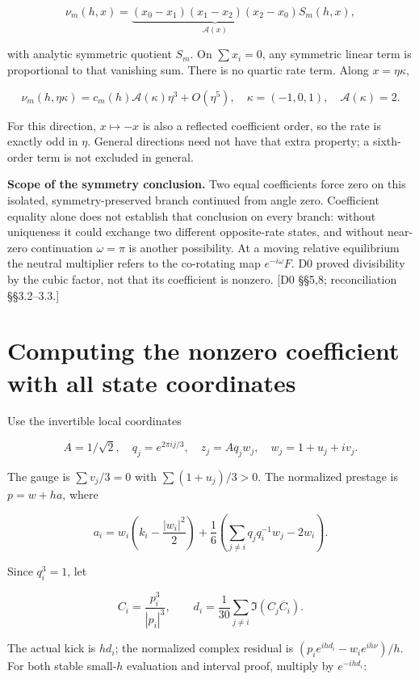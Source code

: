 \documentclass[11pt,a4paper]{article}
\begin{document}
\[
\nu_m(h,x)=
\underbrace{(x_0-x_1)(x_1-x_2)(x_2-x_0)}_{\mathcal A(x)}
S_m(h,x),
\tag{D29}\label{eq:D29}
\]

with analytic symmetric quotient \(S_m\). On \(\sum x_i=0\), any symmetric linear term is proportional to that vanishing sum. There is no quartic rate term. Along \(x=\eta\kappa\),

\[
\nu_m(h,\eta\kappa)=c_m(h)\mathcal A(\kappa)\eta^3+O(\eta^5),
\quad \kappa=(-1,0,1),\quad \mathcal A(\kappa)=2.
\tag{D30}\label{eq:D30}
\]

For this direction, \(x\mapsto-x\) is also a reflected coefficient order, so the rate is exactly odd in \(\eta\). General directions need not have that extra property; a sixth-order term is not excluded in general.

\textbf{Scope of the symmetry conclusion.} Two equal coefficients force zero on this isolated, symmetry-preserved branch continued from angle zero. Coefficient equality alone does not establish that conclusion on every branch: without uniqueness it could exchange two different opposite-rate states, and without near-zero continuation \(\omega=\pi\) is another possibility. At a moving relative equilibrium the neutral multiplier refers to the co-rotating map \(e^{-i\omega}F\). D0 proved divisibility by the cubic factor, not that its coefficient is nonzero. [D0 \S{}\S{}5,8; reconciliation \S{}\S{}3.2--3.3.]

\section{Computing the nonzero coefficient with all state coordinates}

Use the invertible local coordinates

\[
A=1/\sqrt2,\quad q_j=e^{2\pi ij/3},\quad
z_j=Aq_jw_j,\quad w_j=1+u_j+iv_j.
\tag{D31}\label{eq:D31}
\]

The gauge is \(\sum v_j/3=0\) with \(\sum(1+u_j)/3>0\). The normalized prestage is \(p=w+ha\), where

\[
a_i=w_i\left(k_i-\frac{|w_i|^2}{2}\right)
+\frac16\left(\sum_{j\ne i}q_jq_i^{-1}w_j-2w_i\right).
\tag{D32}\label{eq:D32}
\]

Since \(q_i^3=1\), let

\[
C_i=\frac{p_i^3}{|p_i|^3},\qquad
d_i=\frac1{30}\sum_{j\ne i}\Im(C_j\overline C_i).
\tag{D33}\label{eq:D33}
\]

The actual kick is \(hd_i\); the normalized complex residual is
\((p_i e^{ihd_i}-w_i e^{ih\nu})/h\). For both stable small-\(h\) evaluation and interval proof, multiply by \(e^{-ihd_i}\):
\end{document}

